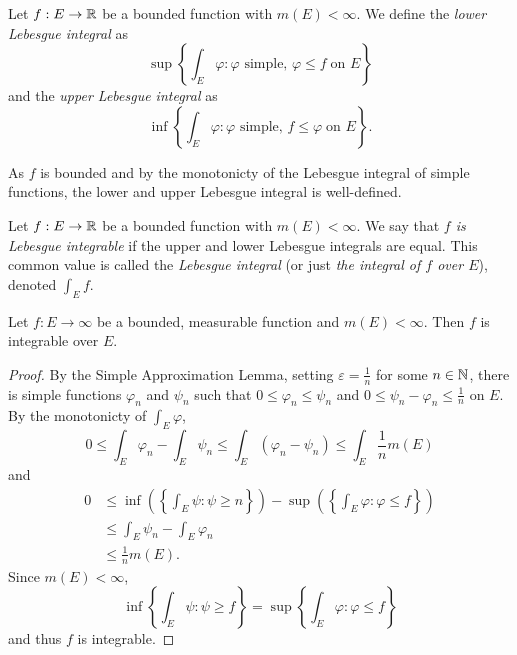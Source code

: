 
\begin{definition}
	Let $f: E \to \mathbb{R}$ be a bounded function with $m(E) < \infty$.
	We define the \emph{lower Lebesgue integral} as
	\[
		\sup \left\{
			\int_E \varphi: 
			\text{$\varphi$ simple},\,
			\varphi \leq f \;\text{on $E$}
		\right\}
	\]
	and the \emph{upper Lebesgue integral} as
	\[
		\inf \left\{
			\int_E \varphi:
			\text{$\varphi$ simple},\,
			f \leq \varphi \;\text{on $E$}
		\right\}.
	\]
\end{definition}

As $f$ is bounded and by the monotonicty of the Lebesgue integral of
simple functions, the lower and upper Lebesgue integral is well-defined.

\begin{definition}
	Let $f: E \to \mathbb{R}$ be a bounded function with $m(E) < \infty$.
	We say that \emph{$f$ is Lebesgue integrable} if the upper and lower
	Lebesgue integrals are equal.
	This common value is called the \emph{Lebesgue integral}
	(or just \emph{the integral of $f$ over $E$}), denoted
	$\int_E f$.
\end{definition}

\begin{theorem}[]
	Let $f: E \to \infty$ be a bounded, measurable function and
	$m(E) < \infty$.
	Then $f$ is integrable over $E$.
\end{theorem}

\begin{proof}
	By the Simple Approximation Lemma, setting $\varepsilon = \frac1n$ for some
	$n \in \mathbb{N}$, there is simple functions $\varphi_n$ and $\psi_n$ such that
	$0 \leq \varphi_n \leq \psi_n$ and $0 \leq \psi_n - \varphi_n \leq \frac1n$
	on $E$.
	By the monotonicty of $\int_E \varphi$,
	\[
		0 
		\leq \int_E \varphi_n - \int_E \psi_n
		\leq \int_E (\varphi_n - \psi_n)
		\leq \int_E
		\frac1n m(E)
	\]
	and
	\begin{align*}
		0 &\leq
		\inf\left( 
			\left\{
				\int_E \psi: \psi \geq n
			\right\} 
		\right) - \sup\left( 
			\left\{
				\int_E \varphi: \varphi \leq f
			\right\} 
		\right) \\
		&\leq \int_E \psi_n - \int_E \varphi_n \\
		&\leq \frac1n m(E).
	\end{align*}
	Since $m(E) < \infty$,
	\[
		\inf\left\{
			\int_E \psi: \psi \geq f
		\right\}
		= \sup\left\{
			\int_E \varphi: \varphi \leq f
		\right\}
	\]
	and thus $f$ is integrable.
\end{proof}

